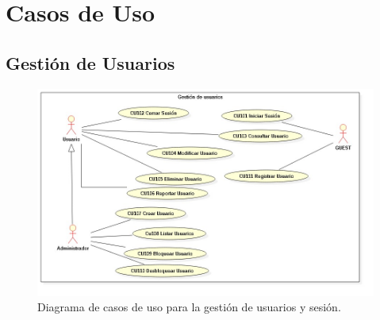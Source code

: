 \chapter{Casos de Uso}
\section{Gesti\'{o}n de Usuarios}

\begin{figure}[h]
\centering
\includegraphics[width=1\textwidth]{Img/CasosDeUso/DCU01.jpg}
\caption{Diagrama de casos de uso para la gesti\'{o}n de usuarios y sesi\'{o}n.}
\label{fig:dcu}
\end{figure}
